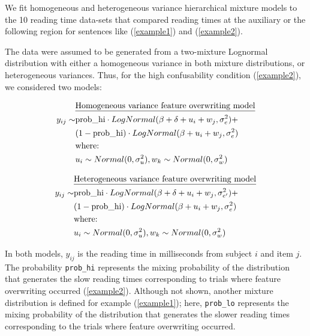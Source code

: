 \documentclass{cambridge7A}\usepackage[]{graphicx}\usepackage[]{color}
\begin{document}
We fit homogeneous and heterogeneous variance hierarchical mixture models to the 10 reading time data-sets that compared reading times at the auxiliary or the following region for sentences like (\ref{example1}) and (\ref{example2}). 

The data were assumed to be generated from a two-mixture Lognormal distribution with either a homogeneous variance in both mixture distributions, or heterogeneous variances. 
Thus, for the high confusability condition (\ref{example2}), we considered two models:

\begin{equation}
\begin{split}
       ~&\hbox{\underline{Homogeneous variance feature overwriting model}}\\
y_{ij} \sim& \hbox{prob\_hi} \cdot LogNormal(\beta+\delta+u_i+w_j,\sigma_{e}^2)+\\
           ~& (1-\hbox{prob\_hi}) \cdot LogNormal(\beta+u_i+w_j,\sigma_e^2)\\
           ~& \hbox{where: }\\
           ~& u_i \sim Normal(0,\sigma_u^2), w_k \sim Normal(0,\sigma_w^2)\\ 
\end{split}
\end{equation}


\begin{equation}
\begin{split}
       ~&\hbox{\underline{Heterogeneous variance feature overwriting model}}\\
y_{ij}
\sim& \hbox{prob\_hi} \cdot LogNormal(\beta+\delta+u_i+w_j,\sigma_{e'}^2)+\\
           ~& (1-\hbox{prob\_hi}) \cdot LogNormal(\beta+u_i+w_j,\sigma_e^2)\\
           ~& \hbox{where: }\\
           ~& u_i \sim Normal(0,\sigma_u^2), w_k \sim Normal(0,\sigma_w^2)\\ 
\end{split}
\end{equation}


\noindent
In both models, 
$y_{ij}$ 
is the reading time in milliseconds from subject $i$ and item $j$.  The probability  \texttt{prob\_hi} represents the mixing probability of the distribution that generates the slow reading times corresponding to trials where feature overwriting occurred (\ref{example2}). Although not shown, another mixture distribution is defined for example (\ref{example1}); here, 
\texttt{prob\_lo} represents the mixing probability of the distribution that generates the slower reading times corresponding to the trials where feature overwriting occurred. 
\end{document}
